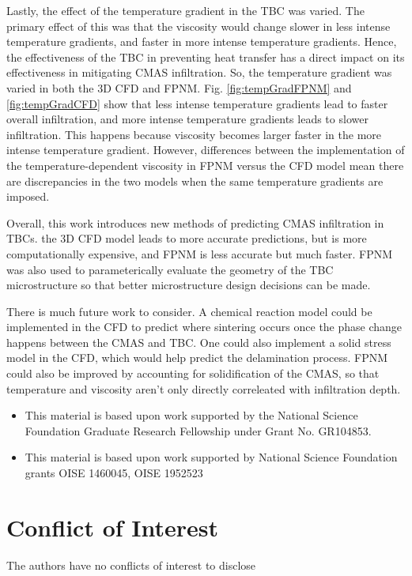 \documentclass[%
 aip,
 amsmath,amssymb,
 reprint,%
]{revtex4-1}
\begin{document}
Lastly, the effect of the temperature gradient in the TBC was varied. The primary effect of this was that the viscosity would change slower in less intense temperature gradients, and faster in more intense temperature gradients. Hence, the effectiveness of the TBC in preventing heat transfer has a direct impact on its effectiveness in mitigating CMAS infiltration. So, the temperature gradient was varied in both the 3D CFD and FPNM. Fig. \ref{fig:tempGradFPNM} and \ref{fig:tempGradCFD} show that less intense temperature gradients lead to faster overall infiltration, and more intense temperature gradients leads to slower infiltration. This happens because viscosity becomes larger faster in the more intense temperature gradient. However, differences between the implementation of the temperature-dependent viscosity in FPNM versus the CFD model mean there are discrepancies in the two models when the same temperature gradients are imposed.

Overall, this work introduces new methods of predicting CMAS infiltration in TBCs. the 3D CFD model leads to more accurate predictions, but is more computationally expensive, and FPNM is less accurate but much faster. FPNM was also used to parameterically evaluate the geometry of the TBC microstructure so that better microstructure design decisions can be made. 

There is much future work to consider. A chemical reaction model could be implemented in the CFD to predict where sintering occurs once the phase change happens between the CMAS and TBC. One could also implement a solid stress model in the CFD, which would help predict the delamination process. FPNM could also be improved by accounting for solidification of the CMAS, so that temperature and viscosity aren't only directly correleated with infiltration depth.

\begin{acknowledgments}
\begin{itemize}
\item This material is based upon work supported 
by the National Science Foundation 
Graduate Research Fellowship under Grant 
No. GR104853.
\item This material is based upon work supported 
by National Science Foundation grants OISE 
1460045, OISE 1952523
\end{itemize}
\end{acknowledgments}

\section*{Conflict of Interest}
The authors have no conflicts of interest to disclose
\end{document}
